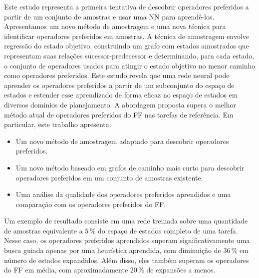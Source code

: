 \documentclass[ppgc,diss,english]{iiufrgs}
\begin{document}
Este estudo representa a primeira tentativa de descobrir operadores preferidos a partir de um conjunto de amostras e usar uma NN para aprendê-los. Apresentamos um novo método de amostragem e uma nova técnica para identificar operadores preferidos em amostras. A técnica de amostragem envolve regressão do estado objetivo, construindo um grafo com estados amostrados que representam suas relações sucessor-predecessor e determinando, para cada estado, o conjunto de operadores usados para atingir o estado objetivo no menor caminho como operadores preferidos. Este estudo revela que uma rede neural pode aprender os operadores preferidos a partir de um subconjunto do espaço de estados e estender esse aprendizado de forma eficaz no espaço de estados em diversos domínios de planejamento. A abordagem proposta supera o melhor método atual de operadores preferidos do FF nas tarefas de referência. Em particular, este trabalho apresenta:

\begin{itemize}
\item Um novo método de amostragem adaptado para descobrir operadores preferidos.
\item Um novo método baseado em grafos de caminho mais curto para descobrir operadores preferidos em um conjunto de amostras existente.
\item Uma análise da qualidade dos operadores preferidos aprendidos e uma comparação com os operadores preferidos do FF.
\end{itemize}

Um exemplo de resultado consiste em uma rede treinada sobre uma quantidade de amostras equivalente a $5\,\%$ do espaço de estados completo de uma tarefa. Nesse caso, os operadores preferidos aprendidos superam significativamente uma busca guiada apenas por uma heurística aprendida, com diminuição de $36\,\%$ em número de estados expandidos. Além disso, eles também superam os operadores do FF em média, com aproximadamente $20\,\%$ de expansões a menos.
\end{document}
